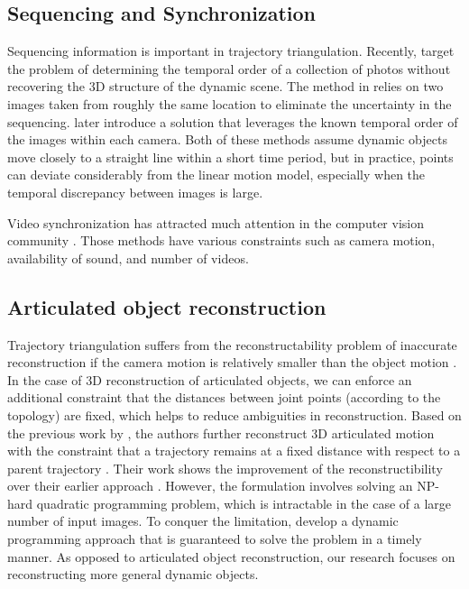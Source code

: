 \subsection{Sequencing and Synchronization}
Sequencing information is important in trajectory triangulation. Recently,
\citet{Basha_ECCV2012, Basha_ICCV2013} target the problem of determining the temporal order of a collection of photos without recovering the 3D structure of the dynamic scene. The method in \citet{Basha_ECCV2012} relies on two images taken from roughly the same location to eliminate the uncertainty in the sequencing. \citet{Basha_ICCV2013} later introduce a solution that leverages the known temporal order of the images within each camera. Both of these methods assume dynamic objects move closely to a straight line within a short time period, but in practice, points can deviate considerably from the linear motion model, especially when the temporal discrepancy between images is large. 

Video synchronization has attracted much attention in the computer vision community \cite{Tuytelaars_CVPR,shrestha2010synchronization,rao2003view}. Those methods have various constraints such as camera motion, availability of sound, and number of videos. 

\subsection{Articulated object reconstruction}
Trajectory triangulation suffers from the reconstructability problem of inaccurate reconstruction if the camera motion is relatively smaller than the object motion \cite{park20153d}. 
In the case of 3D reconstruction of articulated objects, we can enforce an additional constraint that the distances between joint points (according to the topology) are fixed, which helps to reduce ambiguities in reconstruction. 
Based on the previous work by \citet{Park_ECCV2010}, the authors further reconstruct 3D articulated motion with the constraint that a trajectory remains at a fixed distance with respect to a parent trajectory \cite{Park_ICCV2011}. Their work shows the improvement of the reconstructibility over their earlier approach \cite{Park_ECCV2010}.
However, the formulation involves solving an NP-hard quadratic programming problem, which is intractable in the case of a large number of input images. 
To conquer the limitation, \citet{Valmadre_ECCV2012} develop a dynamic programming approach that is guaranteed to solve the problem in a timely manner. 
As opposed to articulated object reconstruction, our research focuses on reconstructing more general dynamic objects. 

